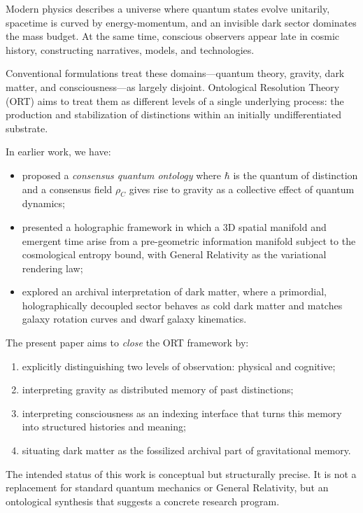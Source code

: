 \documentclass[12pt,a4paper]{article}
\begin{document}
Modern physics describes a universe where quantum states evolve unitarily, spacetime is curved by energy-momentum, and an invisible dark sector dominates the mass budget. At the same time, conscious observers appear late in cosmic history, constructing narratives, models, and technologies.

Conventional formulations treat these domains---quantum theory, gravity, dark matter, and consciousness---as largely disjoint. Ontological Resolution Theory (ORT) aims to treat them as different levels of a single underlying process: the production and stabilization of distinctions within an initially undifferentiated substrate.

In earlier work, we have:
\begin{itemize}
  \item proposed a \emph{consensus quantum ontology} where $\hbar$ is the quantum of distinction and a consensus field $\rho_C$ gives rise to gravity as a collective effect of quantum dynamics;
  \item presented a holographic framework in which a 3D spatial manifold and emergent time arise from a pre-geometric information manifold subject to the cosmological entropy bound, with General Relativity as the variational rendering law;
  \item explored an archival interpretation of dark matter, where a primordial, holographically decoupled sector behaves as cold dark matter and matches galaxy rotation curves and dwarf galaxy kinematics.
\end{itemize}

The present paper aims to \emph{close} the ORT framework by:
\begin{enumerate}
  \item explicitly distinguishing two levels of observation: physical and cognitive;
  \item interpreting gravity as distributed memory of past distinctions;
  \item interpreting consciousness as an indexing interface that turns this memory into structured histories and meaning;
  \item situating dark matter as the fossilized archival part of gravitational memory.
\end{enumerate}

The intended status of this work is conceptual but structurally precise. It is not a replacement for standard quantum mechanics or General Relativity, but an ontological synthesis that suggests a concrete research program.
\end{document}
